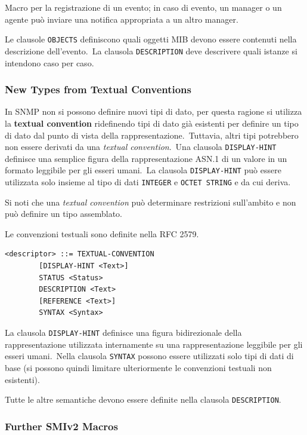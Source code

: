 \noindent Macro per la registrazione di un evento; in caso di evento, un manager o un agente può inviare una notifica appropriata a un altro manager.

Le clausole \texttt{OBJECTS} definiscono quali oggetti MIB devono essere contenuti nella descrizione dell'evento.\
La clausola \texttt{DESCRIPTION} deve descrivere quali istanze si intendono caso per caso.

\subsubsection{New Types from Textual Conventions}

In SNMP non si possono definire nuovi tipi di dato, per questa ragione si utilizza la \textbf{textual convention} ridefinendo tipi di dato già esistenti per definire un tipo di dato dal punto di vista della rappresentazione.\
Tuttavia, altri tipi potrebbero non essere derivati da una \textit{textual convention}.\
Una clausola \texttt{DISPLAY-HINT} definisce una semplice figura della rappresentazione ASN.1 di un valore in un formato leggibile per gli esseri umani.\
La clausola \texttt{DISPLAY-HINT} può essere utilizzata solo insieme al tipo di dati \texttt{INTEGER} e \texttt{OCTET STRING} e da cui deriva.\

Si noti che una \textit{textual convention} può determinare restrizioni sull'ambito e non può definire un tipo assemblato.

Le convenzioni testuali sono definite nella RFC 2579.
\begin{verbatim}
<descriptor> ::= TEXTUAL-CONVENTION
        [DISPLAY-HINT <Text>]
        STATUS <Status>
        DESCRIPTION <Text>
        [REFERENCE <Text>]
        SYNTAX <Syntax>
\end{verbatim}

\noindent La clausola \texttt{DISPLAY-HINT} definisce una figura bidirezionale della rappresentazione utilizzata internamente su una rappresentazione leggibile per gli esseri umani.\
Nella clausola \texttt{SYNTAX} possono essere utilizzati solo tipi di dati di base (si possono quindi limitare ulteriormente le convenzioni testuali non esistenti).

Tutte le altre semantiche devono essere definite nella clausola \texttt{DESCRIP\-TION}.

\subsubsection{Further SMIv2 Macros}

